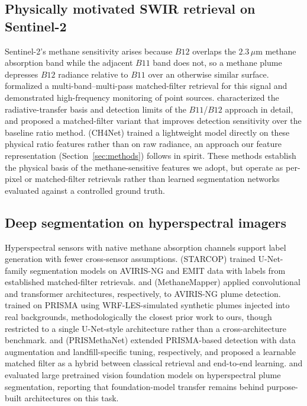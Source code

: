 \documentclass[10pt,twocolumn]{article}
\begin{document}
\subsection{Physically motivated SWIR retrieval on Sentinel-2}

Sentinel-2's methane sensitivity arises because $B12$ overlaps the $2.3\,\mu$m methane absorption band while the adjacent $B11$ band does not, so a methane plume depresses $B12$ radiance relative to $B11$ over an otherwise similar surface. \citet{varon2021highfrequency} formalized a multi-band--multi-pass matched-filter retrieval for this signal and demonstrated high-frequency monitoring of point sources. \citet{gorrono2023understanding} characterized the radiative-transfer basis and detection limits of the $B11$/$B12$ approach in detail, and \citet{wang2024exploiting} proposed a matched-filter variant that improves detection sensitivity over the baseline ratio method. \citet{gorrono2024ch4net} (CH4Net) trained a lightweight model directly on these physical ratio features rather than on raw radiance, an approach our feature representation (Section~\ref{sec:methods}) follows in spirit. These methods establish the physical basis of the methane-sensitive features we adopt, but operate as per-pixel or matched-filter retrievals rather than learned segmentation networks evaluated against a controlled ground truth.

\subsection{Deep segmentation on hyperspectral imagers}

Hyperspectral sensors with native methane absorption channels support label generation with fewer cross-sensor assumptions. \citet{ruzicka2023starcop} (STARCOP) trained U-Net-family segmentation models on AVIRIS-NG and EMIT data with labels from established matched-filter retrievals. \citet{heckman2020deep} and \citet{kumar2023methanemapper} (MethaneMapper) applied convolutional and transformer architectures, respectively, to AVIRIS-NG plume detection. \citet{joyce2023deep} trained on PRISMA using WRF-LES-simulated synthetic plumes injected into real backgrounds, methodologically the closest prior work to ours, though restricted to a single U-Net-style architecture rather than a cross-architecture benchmark. \citet{irakulisloitxate2022prisma} and \citet{bhattacharya2024prismethanet} (PRISMethaNet) extended PRISMA-based detection with data augmentation and landfill-specific tuning, respectively, and \citet{zhang2025learnable} proposed a learnable matched filter as a hybrid between classical retrieval and end-to-end learning. \citet{mohammadi2025foundation} and \citet{sinha2024hyperspectral} evaluated large pretrained vision foundation models on hyperspectral plume segmentation, reporting that foundation-model transfer remains behind purpose-built architectures on this task.
\end{document}

